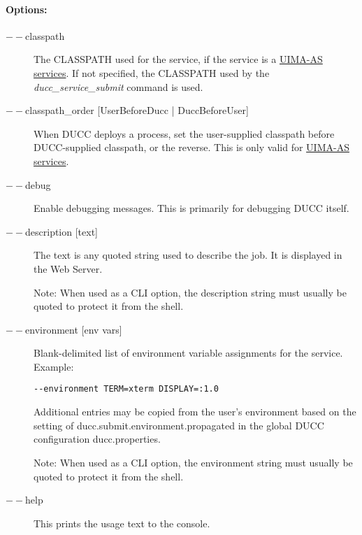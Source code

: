     \paragraph{Options:}
    \begin{description}

        \item[$--$classpath] The CLASSPATH used for the service, if the service is a
          \hyperref[sec:services.types]{UIMA-AS services}.  If not specified, the CLASSPATH used
          by the {\em ducc\_service\_submit} command is used.
          
        \item[$--$classpath\_order {[UserBeforeDucc | DuccBeforeUser]} ] When DUCC deploys a process,
          set the user-supplied classpath before DUCC-supplied classpath, or the reverse.  This is
          only valid for  \hyperref[sec:services.types]{UIMA-AS services}.
          
        \item[$--$debug ]
          Enable debugging messages. This is primarily for debugging DUCC itself. 
          
        \item[$--$description {[text]}] The text is any quoted string used to describe the job. It is
          displayed in the Web Server.

          Note: When used as a CLI option, the description string must usually be quoted to protect
          it from the shell.
    
        \item[$--$environment {[env vars]}] Blank-delimited list of environment variable
          assignments for the service. Example:
          \begin{verbatim}
--environment TERM=xterm DISPLAY=:1.0
          \end{verbatim}

          \begin{sloppypar}
            Additional entries may be copied from the user's environment based on the setting of
            ducc.submit.environment.propagated in the global DUCC configuration ducc.properties.
          \end{sloppypar}
        
          Note: When used as a CLI option, the environment string must usually be
          quoted to protect it from the shell.
          
        \item[$--$help ] This prints the usage text to the console.


\end{description}
